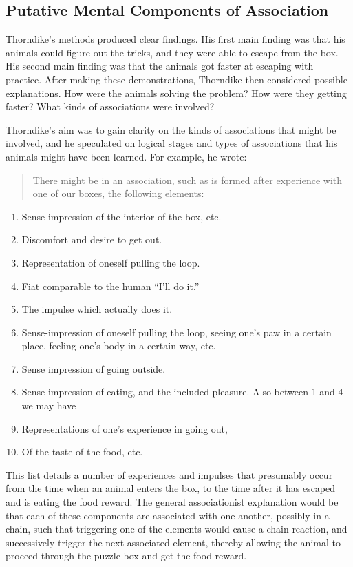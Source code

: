 \documentclass[
  oneside,
  12pt]{crumpbook}
\providecommand{\tightlist}{%
  \setlength{\itemsep}{0pt}\setlength{\parskip}{0pt}}
\begin{document}
\hypertarget{putative-mental-components-of-association}{%
\subsection{Putative Mental Components of Association}\label{putative-mental-components-of-association}}

Thorndike's methods produced clear findings. His first main finding was that his animals could figure out the tricks, and they were able to escape from the box. His second main finding was that the animals got faster at escaping with practice. After making these demonstrations, Thorndike then considered possible explanations. How were the animals solving the problem? How were they getting faster? What kinds of associations were involved?

Thorndike's aim was to gain clarity on the kinds of associations that might be involved, and he speculated on logical stages and types of associations that his animals might have been learned. For example, he wrote:

\begin{quote}
There might be in an association, such as is formed after experience with one of our boxes, the following elements:
\end{quote}

\begin{enumerate}
\def\labelenumi{\arabic{enumi}.}
\tightlist
\item
  Sense-impression of the interior of the box, etc.
\item
  Discomfort and desire to get out.
\item
  Representation of oneself pulling the loop.
\item
  Fiat comparable to the human ``I'll do it.''
\item
  The impulse which actually does it.
\item
  Sense-impression of oneself pulling the loop, seeing one's paw in a certain place, feeling one's body in a certain way, etc.
\item
  Sense impression of going outside.
\item
  Sense impression of eating, and the included pleasure. Also between 1 and 4 we may have
\item
  Representations of one's experience in going out,
\item
  Of the taste of the food, etc.
\end{enumerate}

This list details a number of experiences and impulses that presumably occur from the time when an animal enters the box, to the time after it has escaped and is eating the food reward. The general associationist explanation would be that each of these components are associated with one another, possibly in a chain, such that triggering one of the elements would cause a chain reaction, and successively trigger the next associated element, thereby allowing the animal to proceed through the puzzle box and get the food reward.
\end{document}
